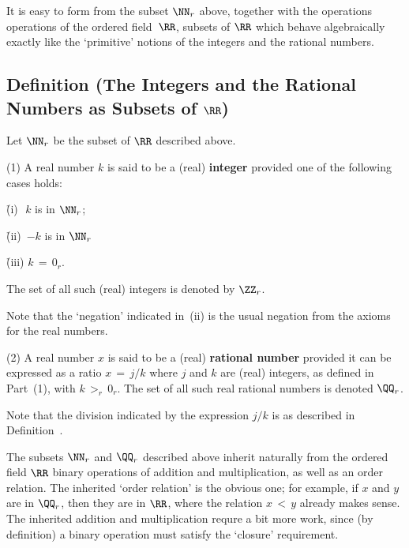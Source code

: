 \VV

        It is easy to form from the subset ${\NN}_{r}$ above, together with the operations operations of the ordered field~${\RR}$,
    subsets of ${\RR}$ which behave algebraically exactly like the `primitive' notions of the integers and the rational numbers.


\V

        \subsection{\small{{\bf Definition}} (The Integers and the Rational Numbers as Subsets of ${\RR}$)}
        \label{DefB25.40}

\V

        Let ${\NN}_{r}$ be the subset of ${\RR}$ described above.

\V

        (1) A real number $k$ is said to be a (real) {\bf integer} provided one of the following cases holds:

        \h (i)\,\, $k$ is in ${\NN}_{r}$;

        \h (ii)\, $-k$ is in ${\NN}_{r}$

        \h (iii)  $k \,=\, 0_{r}$.

\noindent The set of all such (real) integers is denoted by ${\ZZ}_{r}$.

        Note that the `negation' indicated in~(ii) is the usual negation from the axioms for the real numbers.

\V

        (2) A real number $x$ is said to be a (real) {\bf rational number} provided it can be expressed as a ratio $x \,=\, j/k$ where $j$ and $k$ are (real) integers, as defined in Part~(1), with $k\,>_{r}\,0_{r}$.
    The set of all such real rational numbers is denoted ${\QQ}_{r}$.

    Note that the division indicated by the expression $j/k$ is as described in Definition~.

\V
\V

        The subsets ${\NN}_{r}$ and ${\QQ}_{r}$ described above inherit naturally from the ordered field ${\RR}$
    binary operations of addition and multiplication, as well as an order relation.
    The inherited `order relation' is the obvious one; for example, if $x$ and $y$ are in ${\QQ}_{r}$,
    then they are in ${\RR}$, where the relation $x\,<\,y$ already makes sense. The inherited addition and multiplication requre a bit more work,  since (by definition) a binary operation must satisfy the `closure' requirement.


